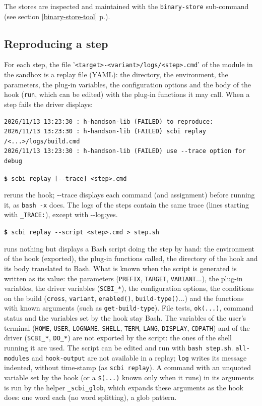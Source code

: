 \documentclass[a4paper,12pt,twoside]{article}
\newcommand{\code}[1]{\texttt{#1}}
\newcommand{\seeref}[1]{see section \ref{#1} p.\pageref{#1}}
\newcommand{\file}[1]{'{\texttt{#1}}'}
\newcommand{\cmd}[1]{\tabto{1cm}\hspace{0.5cm}\texttt{\textbf{\$} #1}}
\newcommand{\ddash}{-{}-}
\begin{document}
The stores are inspected and maintained with the \code{binary-store} sub-command (\seeref{binary-store-tool}).

\subsection{Reproducing a step}
\label{replay}

For each step, the file \file{<target>-<variant>/logs/<step>.cmd} of the
module in the sandbox is a replay file (YAML): the directory, the
environment, the parameters, the plug-in variables, the configuration
options and the body of the hook (\code{run}, which can be edited) with
the plug-in functions it may call. When a step fails the driver
displays:

\begin{footnotesize}
	\begin{verbatim}
2026/11/13 13:23:30 : h-handson-lib (FAILED) to reproduce:
2026/11/13 13:23:30 : h-handson-lib (FAILED) scbi replay /<...>/logs/build.cmd
2026/11/13 13:23:30 : h-handson-lib (FAILED) use --trace option for debug
    \end{verbatim}
\end{footnotesize}

\cmd{scbi replay [\ddash{}trace] <step>.cmd}

reruns the hook; \ddash{}trace displays each command (and assignment)
before running it, as \code{bash -x} does. The logs of the steps contain
the same trace (lines starting with \code{\_TRACE:}), except with
\ddash{}log:yes.

\cmd{scbi replay \ddash{}script <step>.cmd > step.sh}

runs nothing but displays a Bash script doing the step by hand: the
environment of the hook (exported), the plug-in functions called, the
directory of the hook and its body translated to Bash. What is known when
the script is generated is written as its value: the parameters
(\code{PREFIX}, \code{TARGET}, \code{VARIANT}...), the plug-in variables,
the driver variables (\code{SCBI\_*}), the configuration options, the
conditions on the build (\code{cross}, \code{variant}, \code{enabled()},
\code{build-type()}...) and the functions with known arguments (such as
\code{get-build-type}). File tests, \code{ok(...)}, command status and the
variables set by the hook stay Bash. The variables of the user's terminal
(\code{HOME}, \code{USER}, \code{LOGNAME}, \code{SHELL}, \code{TERM},
\code{LANG}, \code{DISPLAY}, \code{CDPATH}) and of the driver
(\code{SCBI\_*}, \code{DO\_*}) are not exported by the script: the ones of
the shell running it are used. The script can be edited and run with
\code{bash step.sh}. \code{all-modules} and \code{hook-output} are not
available in a replay; \code{log} writes its message indented, without
time-stamp (as \code{scbi replay}). A command with an unquoted variable
set by the hook (or a \code{\$(...)} known only when it runs) in its
arguments is run by the helper \code{\_scbi\_glob}, which expands
these arguments as the hook does: one word each (no word splitting), a
glob pattern.
\end{document}
